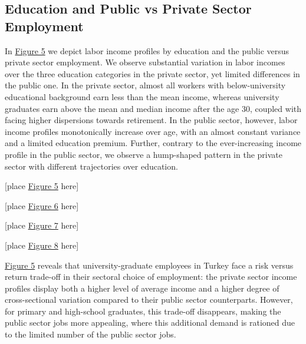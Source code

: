 \documentclass[12pt,author-year]{article}
\begin{document}
\subsection{Education and Public vs Private Sector Employment}
\label{sectioneduc}
In \hyperref[figure5]{Figure 5} we depict labor income profiles by education and the public versus private sector employment. We observe substantial variation in labor incomes over the three education categories in the private sector, yet limited differences in the public one. In the private sector, almost all workers with below-university educational background earn less than the mean income, whereas university graduates earn above the mean and median income after the age 30, coupled with facing higher dispersions towards retirement. In the public sector, however, labor income profiles monotonically increase over age, with an almost constant variance and a limited education premium. Further, contrary to the ever-increasing income profile in the public sector, we observe a hump-shaped pattern in the private sector with different trajectories over education. 

\begin{center}
	[place \hyperref[figure5]{Figure 5} here]
\end{center}

\begin{center}
	[place \hyperref[figure6]{Figure 6} here]
\end{center}

\begin{center}
	[place \hyperref[figure6]{Figure 7} here]
\end{center}

\begin{center}
	[place \hyperref[figure6]{Figure 8} here]
\end{center}

\hyperref[figure5]{Figure 5} reveals that university-graduate employees in Turkey face a risk versus return trade-off in their sectoral choice of employment: the private sector income profiles display both a higher level of average income and a higher degree of cross-sectional variation compared to their public sector counterparts. However, for primary and high-school graduates, this trade-off disappears, making the public sector jobs more appealing, where this additional demand is rationed due to the limited number of the public sector jobs.
\end{document}
